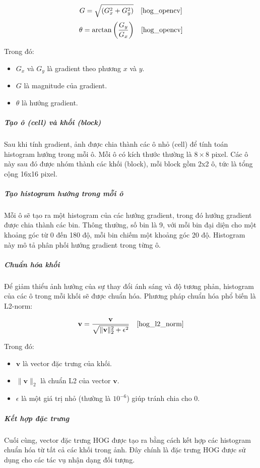 \documentclass[a4paper,12pt]{article}
\begin{document}
\[
G = \sqrt{(G_x^2 + G_y^2)} \quad \text{\cite{hog_opencv}}
\]
\[
\theta = \arctan{\left(\frac{G_y}{G_x}\right)} \quad \text{\cite{hog_opencv}}
\]


\hspace{5mm}Trong đó:
\begin{itemize}
    \item \(G_x\) và \(G_y\) là gradient theo phương \(x\) và \(y\).
    \item \(G\) là magnitude của gradient.
    \item \(\theta\) là hướng gradient.
\end{itemize}

\subparagraph{Tạo ô (cell) và khối (block)}
\hspace{5mm}Sau khi tính gradient, ảnh được chia thành các ô nhỏ (cell) để tính toán histogram hướng trong mỗi ô. Mỗi ô có kích thước thường là \(8 \times 8\) pixel. Các ô này sau đó được nhóm thành các khối (block), mỗi block gồm 2x2 ô, tức là tổng cộng 16x16 pixel.

\subparagraph{Tạo histogram hướng trong mỗi ô}
\hspace{5mm}Mỗi ô sẽ tạo ra một histogram của các hướng gradient, trong đó hướng gradient được chia thành các bin. Thông thường, số bin là 9, với mỗi bin đại diện cho một khoảng góc từ 0 đến 180 độ, mỗi bin chiếm một khoảng góc 20 độ. Histogram này mô tả phân phối hướng gradient trong từng ô.

\subparagraph{Chuẩn hóa khối}
\hspace{5mm}Để giảm thiểu ảnh hưởng của sự thay đổi ánh sáng và độ tương phản, histogram của các ô trong mỗi khối sẽ được chuẩn hóa. Phương pháp chuẩn hóa phổ biến là L2-norm:

\[
\mathbf{v} = \frac{\mathbf{v}}{\sqrt{\|\mathbf{v}\|_2^2 + \epsilon^2}} \quad \text{\cite{hog_l2_norm}}
\]

Trong đó:
\begin{itemize}
    \item \(\mathbf{v}\) là vector đặc trưng của khối.
    \item \(\|\mathbf{v}\|_2\) là chuẩn L2 của vector \(\mathbf{v}\).
    \item \(\epsilon\) là một giá trị nhỏ (thường là \(10^{-6}\)) giúp tránh chia cho 0.
\end{itemize}

\subparagraph{Kết hợp đặc trưng}
\hspace{5mm}Cuối cùng, vector đặc trưng HOG được tạo ra bằng cách kết hợp các histogram chuẩn hóa từ tất cả các khối trong ảnh. Đây chính là đặc trưng HOG được sử dụng cho các tác vụ nhận dạng đối tượng.
\end{document}
